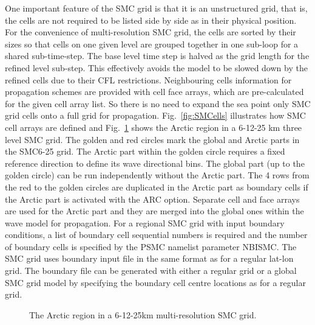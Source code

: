 One important feature of the SMC grid is that it is an unstructured grid, that
is, the cells are not required to be listed side by side as in their physical
position. For the convenience of multi-resolution SMC grid, the cells are
sorted by their sizes so that cells on one given level are grouped together in
one sub-loop for a shared sub-time-step.  The base level time step is halved
as the grid length for the refined level sub-step. This effectively avoids the
model to be slowed down by the refined cells due to their CFL restrictions. 
Neighbouring cells information for propagation schemes are provided with cell 
face arrays, which are pre-calculated for the given cell array list. So there 
is no need to expand the sea point only SMC grid cells onto a full grid for 
propagation. Fig.~\ref{fig:SMCells} illustrates how SMC cell arrays are 
defined and Fig.~\ref{fig:SMC_Arctic} shows the Arctic region in a 6-12-25 km 
three level SMC grid. The golden and red circles mark the global and Arctic 
parts in the SMC6-25 grid. The Arctic part within the golden circle requires a 
fixed reference direction to define its wave directional bins. The global part 
(up to the golden circle) can be run independently without the Arctic part. 
The 4 rows from the red to the golden circles are duplicated in the Arctic part 
as boundary cells if the Arctic part is activated with the ARC option.  
Separate cell and face arrays are used for the Arctic part and they are merged 
into the global ones within the wave model for propagation.  For a regional SMC
grid with input boundary conditions, a list of boundary cell sequential numbers
is required and the number of boundary cells is specified by the {\F PSMC}
namelist parameter {\code NBISMC}. The SMC grid uses boundary input file in the
same format as for a regular lat-lon grid.  The boundary file can be generated
with either a regular grid or a global SMC grid model by specifying the
boundary cell centre locations as for a regular grid.

\begin{figure}
\centerline{}
\caption{The Arctic region in a 6-12-25km multi-resolution SMC grid.}
\label{fig:SMC_Arctic} 
\botline
\end{figure}

